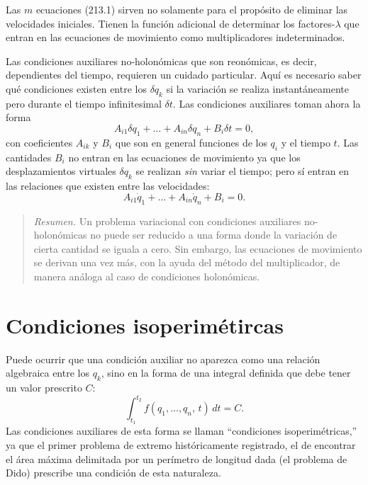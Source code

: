 \documentclass[12pt,a4paper]{book}
\begin{document}
Las $m$ ecuaciones (213.1) sirven no solamente para el propósito de eliminar las velocidades iniciales. Tienen la función adicional de determinar los factores-$\lambda$ que entran en las ecuaciones de movimiento como multiplicadores indeterminados.

Las condiciones auxiliares no-holonómicas que son reonómicas, es decir, dependientes del tiempo, requieren un cuidado particular. Aquí es necesario saber qué condiciones existen entre los $\delta q_k$ si la variación se realiza instantáneamente pero durante el tiempo infinitesimal $\delta t$. Las condiciones auxiliares toman ahora la forma
\begin{equation}
A_{i1}\delta q_1 + \ldots + A_{in}\delta q_n + B_i \delta t = 0, \tag{213.2}
\end{equation}
con coeficientes $A_{ik}$ y $B_i$ que son en general funciones de los $q_i$ y el tiempo $t$. Las cantidades $B_i$ no entran en las ecuaciones de movimiento ya que los desplazamientos virtuales $\delta q_k$ se realizan \textit{sin} variar el tiempo; pero sí entran en las relaciones que existen entre las velocidades:
\begin{equation}
A_{i1}\dot{q}_1 + \ldots + A_{in}\dot{q}_n + B_i = 0. \tag{213.3}
\end{equation}

\begin{quote}
\textit{Resumen.} Un problema variacional con condiciones auxiliares no-holonómicas no puede ser reducido a una forma donde la variación de cierta cantidad se iguala a cero. Sin embargo, las ecuaciones de movimiento se derivan una vez más, con la ayuda del método del multiplicador, de manera análoga al caso de condiciones holonómicas.
\end{quote}

\section{Condiciones isoperimétircas}

Puede ocurrir que una condición auxiliar no aparezca como una relación algebraica entre los $q_k$, sino en la forma de una integral definida que debe tener un valor prescrito $C$:
\begin{equation}
\int_{t_1}^{t_2} f(q_1, \ldots, q_n, \, t) \, dt = C. \tag{214.1}
\end{equation}
Las condiciones auxiliares de esta forma se llaman ``condiciones isoperimét\-ricas,'' ya que el primer problema de extremo históricamente registrado, el de encontrar el área máxima delimitada por un perímetro de longitud dada (el problema de Dido) prescribe una condición de esta naturaleza.
\end{document}
